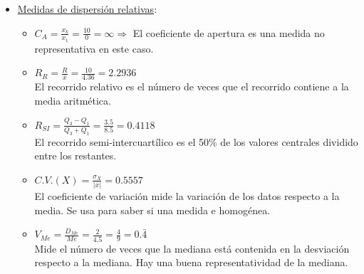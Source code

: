 \begin{ejercicio}
\begin{enumerate}
\begin{itemize}
            \item \underline{Medidas de dispersión relativas}:
            \begin{itemize}
                \item $C_A = \frac{x_k}{x_1} = \frac{10}{0} = \infty \Longrightarrow$ El coeficiente de apertura es una medida no representativa en este caso.
                \item $R_R = \frac{R}{\bar{x}} = \frac{10}{4.36} = 2.2936$\\
                El recorrido relativo es el número de veces que el recorrido contiene a la media aritmética.
                \item $R_{SI} = \frac{Q_3 - Q_1}{Q_3 + Q_1} = \frac{3.5}{8.5} = 0.4118$\\
                El recorrido semi-intercuartílico es el 50\% de los valores centrales dividido entre los restantes.
                \item $C.V.(X) = \frac{\sigma_X}{|\bar{x}|} = 0.5557$\\
                El coeficiente de variación mide la variación de los datos respecto a la media. Se usa para saber si una medida e homogénea.
                \item $V_{Me} = \frac{D_{Me}}{Me} = \frac{2}{4.5} = \frac{4}{9} = 0.\bar{4}$\\
                Mide el número de veces que la mediana está contenida en la desviación  respecto a la mediana. Hay una buena representatividad de la mediana. 
            \end{itemize}
        \end{itemize}
    \end{enumerate}
\end{ejercicio}


